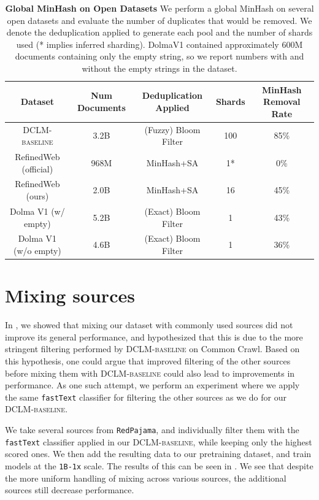 \documentclass{article}
\newcommand{\hqpool}{\textsc{DCLM-baseline}\xspace}
\newcommand{\strack}{\texttt{1B-1x}\xspace}
\newcommand{\rpj}{\texttt{RedPajama}\xspace}
\newcommand{\fasttext}{\texttt{fastText}\xspace}
\newcommand{\commoncrawl}{Common Crawl\xspace}
\begin{document}
\begin{table}[t]
\centering
\small
\caption{\textbf{Global MinHash on Open Datasets} We perform a global MinHash on several open datasets and evaluate the number of duplicates that would be removed. We denote the deduplication applied to generate each pool and the number of shards used (* implies inferred sharding). DolmaV1 contained approximately 600M documents containing only the empty string, so we report numbers with and without the empty strings in the dataset.}
\label{table:dedup-ablations-minhash}
\begin{tabular}{cccc|c}
\toprule
Dataset & Num Documents & Deduplication Applied & Shards & MinHash Removal Rate \\
\midrule
\hqpool & 3.2B & (Fuzzy) Bloom Filter & 100 & 85\% \\
RefinedWeb (official) & 968M & MinHash+SA & 1* & 0\% \\
RefinedWeb (ours) & 2.0B & MinHash+SA & 16 & 45\% \\
Dolma V1 (w/ empty) & 5.2B & (Exact) Bloom Filter & 1 & 43\% \\
Dolma V1 (w/o empty) & 4.6B & (Exact) Bloom Filter & 1 & 36\% \\
\bottomrule
\end{tabular}
\end{table}






\section{Mixing sources}\label{appx:mixing}

In , we showed that mixing our dataset with commonly used sources did not improve its general performance, and hypothesized that this is due to the more stringent filtering performed by \hqpool on \commoncrawl.
Based on this hypothesis, one could argue that improved filtering of the other sources before mixing them with \hqpool could also lead to improvements in performance.
As one such attempt, we perform an experiment where we apply the same \fasttext classifier for filtering
the other sources as we do for our \hqpool.

We take several sources from \rpj \citep{rpj}, and individually filter them with the \fasttext classifier applied in our \hqpool, while keeping only the highest scored ones.
We then add the resulting data to our pretraining dataset, and train models at the \strack scale.
The results of this can be seen in .
We see that despite the more uniform handling of mixing across various sources, the additional sources still decrease performance.
\end{document}
